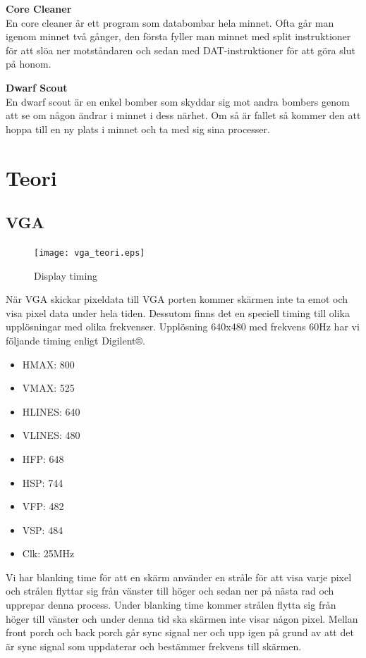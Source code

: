 \documentclass[11pt]{article}
\begin{document}
\textbf{Core Cleaner} \\
En core cleaner är ett program som databombar hela minnet. Ofta går man igenom minnet två gånger, den första fyller man minnet med split instruktioner för att slöa ner motståndaren och sedan med DAT-instruktioner för att göra slut på honom.

\textbf{Dwarf Scout} \\
En dwarf scout är en enkel bomber som skyddar sig mot andra bombers genom att se om någon ändrar i minnet i dess närhet. Om så är fallet så kommer den att hoppa till en ny plats i minnet och ta med sig sina processer.

\newpage

\section{Teori}

\subsection{VGA}

\begin{figure}[h]
    \begin{center}
        \texttt{[image: vga\_teori.eps]}
        \caption{Display timing}
        \label{fig:display_timing}
    \end{center}
\end{figure}

När VGA skickar pixeldata till VGA porten kommer skärmen inte ta emot och visa pixel data under hela tiden. Dessutom finns det en speciell timing till olika upplösningar med olika frekvenser. Upplösning 640x480 med frekvens 60Hz har vi följande timing enligt Digilent®.

\begin{itemize}
    \item HMAX: 800
    \item VMAX: 525
    \item HLINES: 640
    \item VLINES: 480
    \item HFP: 648
    \item HSP: 744
    \item VFP: 482
    \item VSP: 484
    \item Clk: 25MHz
\end{itemize}

Vi har blanking time för att en skärm använder en stråle för att visa varje pixel och strålen flyttar sig från vänster till höger och sedan ner på nästa rad och upprepar denna process. Under blanking time kommer strålen flytta sig från höger till vänster och under denna tid ska skärmen inte visar någon pixel. Mellan front porch och back porch går sync signal ner och upp igen på grund av att det är sync signal som uppdaterar och bestämmer frekvens till skärmen.
\end{document}
